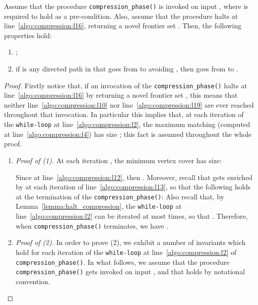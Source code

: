 \begin{proposition}\label{prop:compressed_frontier}
Assume that the procedure \texttt{compression\_phase()} is invoked on input
,
where  is required to hold as a pre-condition.
Also, assume that the procedure halts at line~\ref{algo:compression:l16}, returning a novel frontier set .
Then, the following properties hold:
\begin{enumerate}
\item ;
\item if  is any directed path  in  that goes from  to  avoiding , then  goes from  to .
\end{enumerate}
\end{proposition}
\begin{proof}
Firstly notice that, if an invocation of the \texttt{compression\_phase()}
halts at line~\ref{algo:compression:l16} by returning a novel frontier set ,
this means that neither line~\ref{algo:compression:l10} nor
line~\ref{algo:compression:l19} are ever reached throughout that invocation.
In particular this implies that, at each iteration  of
the \texttt{while-loop} at line~\ref{algo:compression:l2},
the maximum matching  (computed at line~\ref{algo:compression:l4})
has size ; this fact is assumed throughout the whole proof.

\begin{enumerate}
    \item \emph{Proof of (1).} At each iteration , the minimum vertex cover  has size:

Since  at line~\ref{algo:compression:l12}, then .
Moreover, recall that  gets enriched by  at each iteration of line~\ref{algo:compression:l13},
so that the following holds at the termination of the \texttt{compression\_phase()}:
 Also recall that, by Lemma~\ref{lemma:halt_compression},
the \texttt{while-loop} at line~\ref{algo:compression:l2} can be iterated at most  times, so that .
Therefore, when \texttt{compression\_phase()} terminates, we have .


\item \emph{Proof of (2).} In order to prove (2),
we exhibit a number of invariants which hold for each iteration of the \texttt{while-loop} at line~\ref{algo:compression:l2} of \texttt{compression\_phase()}.
In what follows, we assume that the procedure \texttt{compression\_phase()} gets invoked on input
,
and that  holds by notational convention.


\end{enumerate}
\end{proof}
